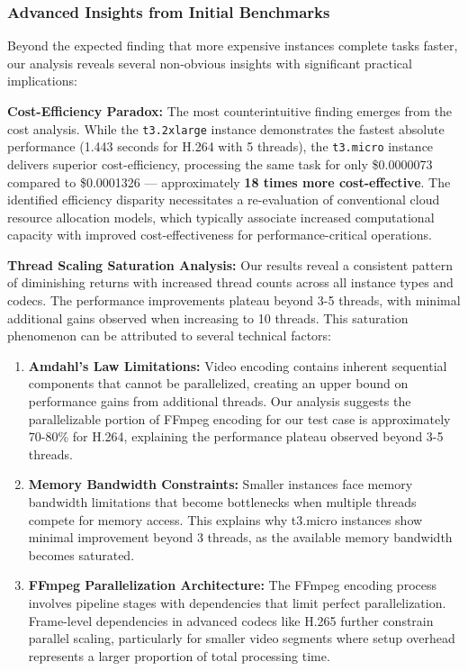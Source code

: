 \documentclass[conference]{IEEEtran}
\begin{document}
	\subsubsection{Advanced Insights from Initial Benchmarks}
	
	Beyond the expected finding that more expensive instances complete tasks faster, our analysis reveals several non-obvious insights with significant practical implications:
	
	\textbf{Cost-Efficiency Paradox:} The most counterintuitive finding emerges from the cost analysis. While the \texttt{t3.2xlarge} instance demonstrates the fastest absolute performance (1.443 seconds for H.264 with 5 threads), the \texttt{t3.micro} instance delivers superior cost-efficiency, processing the same task for only \$0.0000073 compared to \$0.0001326 — approximately \textbf{18 times more cost-effective}. The identified efficiency disparity necessitates a re-evaluation of conventional cloud resource allocation models, which typically associate increased computational capacity with improved cost-effectiveness for performance-critical operations.
	
	\textbf{Thread Scaling Saturation Analysis:} Our results reveal a consistent pattern of diminishing returns with increased thread counts across all instance types and codecs. The performance improvements plateau beyond 3-5 threads, with minimal additional gains observed when increasing to 10 threads. This saturation phenomenon can be attributed to several technical factors:
	
	\begin{enumerate}
		\item \textbf{Amdahl's Law Limitations:} Video encoding contains inherent sequential components that cannot be parallelized, creating an upper bound on performance gains from additional threads. Our analysis suggests the parallelizable portion of FFmpeg encoding for our test case is approximately 70-80\% for H.264, explaining the performance plateau observed beyond 3-5 threads.
		
		\item \textbf{Memory Bandwidth Constraints:} Smaller instances face memory bandwidth limitations that become bottlenecks when multiple threads compete for memory access. This explains why t3.micro instances show minimal improvement beyond 3 threads, as the available memory bandwidth becomes saturated.
		
		\item \textbf{FFmpeg Parallelization Architecture:} The FFmpeg encoding process involves pipeline stages with dependencies that limit perfect parallelization. Frame-level dependencies in advanced codecs like H.265 further constrain parallel scaling, particularly for smaller video segments where setup overhead represents a larger proportion of total processing time.
	\end{enumerate}
	
\end{document}
